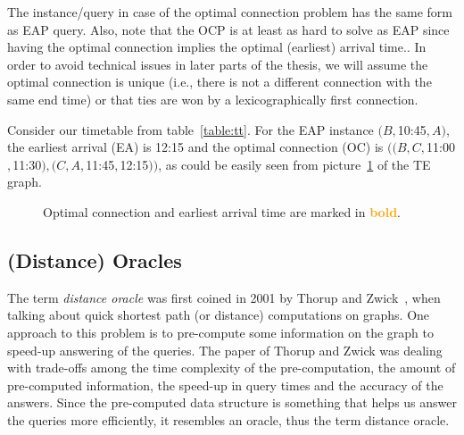 	\noindent The instance/query in case of the optimal connection problem has the same form as EAP query. Also, note that the OCP is at least as hard to solve as EAP since having the optimal connection implies the optimal (earliest) arrival time.. In order to avoid technical issues in later parts of the thesis, we will assume the optimal connection is unique (i.e., there is not a different connection with the same end time) or that ties are won by a lexicographically first connection. 
	
	\begin{example}
		Consider our timetable from table~\ref{table:tt}. For the EAP instance $(B, $10:45$, A)$, the earliest arrival (EA) is 12:15 and the optimal connection (OC) is $((B, C, $11:00$, $11:30$), (C, A, $11:45$, $12:15$))$, as could be easily seen from picture~\ref{pic:ea} of the TE graph.
	\end{example}

	\begin{figure}[h!]
	    \begin{center}
	    \end{center}
    	\caption{\label{pic:ea} Optimal connection and earliest arrival time are marked in \textcolor{orange}{\textbf{bold}}.}
	\end{figure}
	
\subsection{(Distance) Oracles}

	The term \textit{distance oracle} was first coined in 2001 by Thorup and Zwick~\cite{apxdo05}, when talking about quick shortest path (or distance) computations on graphs. One approach to this problem is to pre-compute some information on the graph to speed-up answering of the queries. The paper of Thorup and Zwick was dealing with trade-offs among the time complexity of the pre-computation, the amount of pre-computed information, the speed-up in query times and the accuracy of the answers. Since the pre-computed data structure is something that helps us answer the queries more efficiently, it resembles an oracle, thus the term distance oracle.

